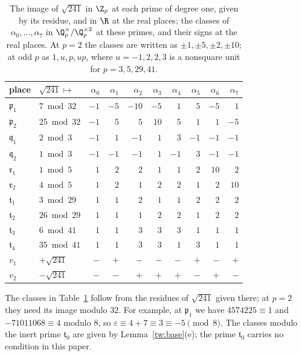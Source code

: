 \begin{table}[htbp]
\centering
\caption{The image of $\sqrt{241}$ in $\Z_p$ at each prime of degree one,
given by its residue, and in $\R$ at the real places; the classes of
$\alpha_0,\dots,\alpha_7$ in $\Q_p^\times/\Q_p^{\times2}$ at these primes, and
their signs at the real places. At $p=2$ the classes are written as
$\pm1,\pm5,\pm2,\pm10$; at odd $p$ as $1,u,p,up$, where $u=-1,2,2,3$ is a
nonsquare unit for $p=3,5,29,41$.}
\label{tw:squareclass-table}
\begin{tabular}{llrrrrrrrr}
\toprule
place & $\sqrt{241}\mapsto$ & $\alpha_0$ & $\alpha_1$ & $\alpha_2$ & $\alpha_3$ & $\alpha_4$ & $\alpha_5$ & $\alpha_6$ & $\alpha_7$\\
\midrule
$\mathfrak p_1$ & $7\bmod 32$ & $-1$ & $-5$ & $-10$ & $-5$ & $1$ & $5$ & $-5$ & $1$\\
$\mathfrak p_2$ & $25\bmod 32$ & $-1$ & $5$ & $5$ & $10$ & $5$ & $1$ & $1$ & $-5$\\
$\mathfrak q_1$ & $2\bmod 3$ & $-1$ & $1$ & $-1$ & $1$ & $3$ & $-1$ & $-1$ & $-1$\\
$\mathfrak q_2$ & $1\bmod 3$ & $-1$ & $-1$ & $-1$ & $1$ & $-1$ & $3$ & $-1$ & $-1$\\
$\mathfrak r_1$ & $1\bmod 5$ & $1$ & $2$ & $2$ & $1$ & $1$ & $2$ & $10$ & $2$\\
$\mathfrak r_2$ & $4\bmod 5$ & $1$ & $2$ & $1$ & $2$ & $2$ & $1$ & $2$ & $10$\\
$\mathfrak t_1$ & $3\bmod 29$ & $1$ & $1$ & $2$ & $1$ & $1$ & $2$ & $2$ & $2$\\
$\mathfrak t_2$ & $26\bmod 29$ & $1$ & $1$ & $1$ & $2$ & $2$ & $1$ & $2$ & $2$\\
$\mathfrak t_3$ & $6\bmod 41$ & $1$ & $1$ & $3$ & $3$ & $3$ & $1$ & $1$ & $1$\\
$\mathfrak t_4$ & $35\bmod 41$ & $1$ & $1$ & $3$ & $3$ & $1$ & $3$ & $1$ & $1$\\
$v_1$ & $+\sqrt{241}$ & $-$ & $+$ & $-$ & $-$ & $-$ & $+$ & $-$ & $+$\\
$v_2$ & $-\sqrt{241}$ & $-$ & $-$ & $+$ & $+$ & $+$ & $-$ & $+$ & $-$\\
\bottomrule
\end{tabular}
\end{table}

The classes in Table~\ref{tw:squareclass-table} follow from the residues of
$\sqrt{241}$ given there; at $p=2$ they need its image modulo $32$. For
example, at $\mathfrak p_1$ we have $4574225\equiv1$ and $-71011068\equiv4$
modulo $8$, so $\varepsilon\equiv4+7\equiv3\equiv-5\pmod 8$. The classes
modulo the inert prime $\mathfrak t_0$ are given by Lemma~\ref{tw:base}(e);
the prime $\mathfrak t_0$ carries no condition in this paper.

